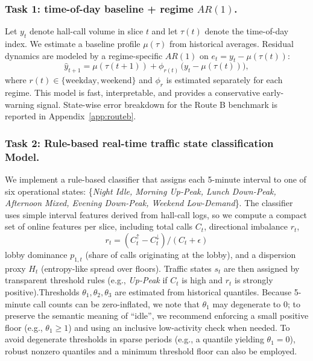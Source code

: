 \subsubsection{Task 1: time-of-day baseline + regime $AR(1)$.}\label{subsubsec:routebtask1}
Let $y_t$ denote hall-call volume in slice $t$ and let $\tau(t)$ denote the time-of-day index. We estimate a baseline profile
$\mu(\tau)$ from historical averages. Residual dynamics are modeled by a regime-specific $AR(1)$ on $e_t = y_t-\mu(\tau(t))$:
\[
\hat y_{t+1}=\mu(\tau(t+1)) + \phi_{r(t)}\,\bigl(y_t-\mu(\tau(t))\bigr),
\]
where $r(t)\in\{\text{weekday},\text{weekend}\}$ and $\phi_{r}$ is estimated separately for each regime. This model is fast,
interpretable, and provides a conservative early-warning signal. State-wise error breakdown for the Route B benchmark is reported in Appendix~\ref{app:routeb}.


\subsubsection{Task 2: Rule-based real-time traffic state classification Model.}\label{subsubsec:routebtask2}
We implement a rule-based classifier that assigns each 5-minute interval to one of six operational states:
\{\textit{Night Idle, Morning Up-Peak, Lunch Down-Peak, Afternoon Mixed, Evening Down-Peak, Weekend Low-Demand}\}.
The classifier uses simple interval features derived from hall-call logs,
so we compute a compact set of online features per slice, including total calls $C_t$, directional imbalance $r_t$, \[r_t=(C^{\uparrow}_t-C^{\downarrow}_t)/(C_t+\epsilon)\]
lobby dominance $p_{1,t}$ (share of calls originating at the lobby), and a dispersion proxy $H_t$ (entropy-like spread over floors).
Traffic states $s_t$ are then assigned by transparent threshold rules (e.g., \emph{Up-Peak} if $C_t$ is high and $r_t$ is strongly positive).Thresholds $\theta_1,\theta_2,\theta_3$ are estimated from historical quantiles. 
Because 5-minute call counts can be zero-inflated, we note that $\theta_1$ may degenerate to 0; to preserve the semantic meaning of ``idle'', we recommend enforcing a small positive floor (e.g., $\theta_1 \ge 1$) and using an inclusive low-activity check when needed.
To avoid degenerate thresholds in sparse periods (e.g., a quantile yielding $\theta_1=0$), robust nonzero quantiles and a minimum threshold floor can also be employed.

